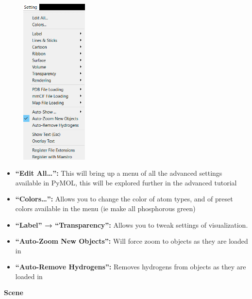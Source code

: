 \documentclass{article}
\begin{document}
\begin{figure}[h!]
    \centering
    \includegraphics[width=0.3\textwidth]{workshops/pymol/imgs/settingtab.png}
    \caption[]{}
    \label{settingtab}
\end{figure}

\begin{itemize}

\item \textbf{“Edit All…”:}  This will bring up a menu of all the advanced settings available in PyMOL, this will be explored further in the advanced tutorial

\item \textbf{“Colors…”:}  Allows you to change the color of atom types, and of preset colors available in the menu (ie make all phosphorous green)

\item \textbf{“Label” →  “Transparency”:}  Allows you to tweak settings of visualization.

\item \textbf{“Auto-Zoom New Objects”:}  Will force zoom to objects as they are loaded in

\item \textbf{“Auto-Remove Hydrogens”:}  Removes hydrogens from objects as they are loaded in

\end{itemize}


\begin{center}
    \Large \textbf{Scene}
\end{center}
\end{document}
